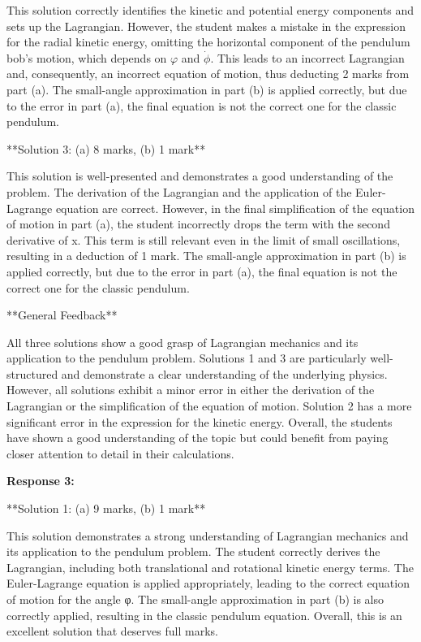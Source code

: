 \documentclass[a4paper,11pt]{article}
\begin{document}
This solution correctly identifies the kinetic and potential energy components and sets up the Lagrangian. However, the student makes a mistake in the expression for the radial kinetic energy, omitting the horizontal component of the pendulum bob's motion, which depends on $\varphi$ and \(\dot{\phi}\). This leads to an incorrect Lagrangian and, consequently, an incorrect equation of motion, thus deducting 2 marks from part (a). The small-angle approximation in part (b) is applied correctly, but due to the error in part (a), the final equation is not the correct one for the classic pendulum.

**Solution 3: (a) 8 marks, (b) 1 mark**

This solution is well-presented and demonstrates a good understanding of the problem. The derivation of the Lagrangian and the application of the Euler-Lagrange equation are correct. However, in the final simplification of the equation of motion in part (a), the student incorrectly drops the term with the second derivative of x. This term is still relevant even in the limit of small oscillations, resulting in a deduction of 1 mark. The small-angle approximation in part (b) is applied correctly, but due to the error in part (a), the final equation is not the correct one for the classic pendulum.

**General Feedback**

All three solutions show a good grasp of Lagrangian mechanics and its application to the pendulum problem. Solutions 1 and 3 are particularly well-structured and demonstrate a clear understanding of the underlying physics. However, all solutions exhibit a minor error in either the derivation of the Lagrangian or the simplification of the equation of motion. Solution 2 has a more significant error in the expression for the kinetic energy. Overall, the students have shown a good understanding of the topic but could benefit from paying closer attention to detail in their calculations.

\bigskip    
\textbf{Response 3:}

**Solution 1: (a) 9 marks, (b) 1 mark**

This solution demonstrates a strong understanding of Lagrangian mechanics and its application to the pendulum problem. The student correctly derives the Lagrangian, including both translational and rotational kinetic energy terms. The Euler-Lagrange equation is applied appropriately, leading to the correct equation of motion for the angle φ. The small-angle approximation in part (b) is also correctly applied, resulting in the classic pendulum equation. Overall, this is an excellent solution that deserves full marks.
\end{document}
